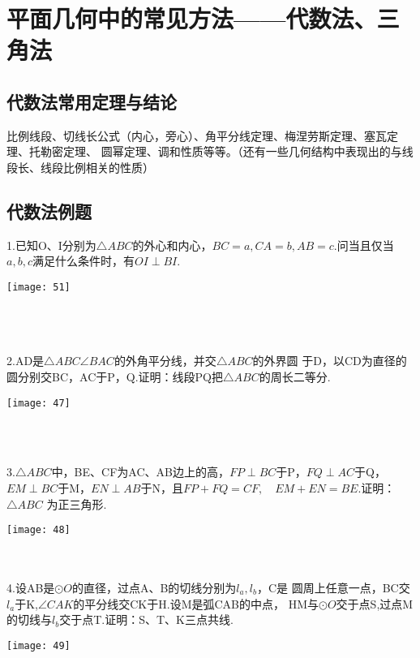 \section{平面几何中的常见方法——代数法、三角法}

\subsection{代数法常用定理与结论}

比例线段、切线长公式（内心，旁心）、角平分线定理、梅涅劳斯定理、塞瓦定理、托勒密定理、
圆幂定理、调和性质等等。（还有一些几何结构中表现出的与线段长、线段比例相关的性质）

\subsection{代数法例题}
1.已知O、I分别为$\bigtriangleup ABC$的外心和内心，$BC=a,CA=b,AB=c$.问当且仅当$a,b,c$满足什么条件时，有$OI\perp BI$.
\begin{flushleft}
    \texttt{[image: 51]}
\end{flushleft}
~\\
~\\
~\\


2.AD是$\bigtriangleup ABC\angle BAC$的外角平分线，并交$\bigtriangleup ABC$的外界圆
于D，以CD为直径的圆分别交BC，AC于P，Q.证明：线段PQ把$\bigtriangleup ABC$的周长二等分.
\begin{flushleft}
    \texttt{[image: 47]}
\end{flushleft}
~\\
~\\
\newpage

3.$\bigtriangleup ABC$中，BE、CF为AC、AB边上的高，$FP\perp BC$于P，$FQ\perp AC$于Q，
$EM\perp BC$于M，$EN\perp AB$于N，且$FP+FQ=CF,\quad EM+EN=BE$.证明：$\bigtriangleup ABC$
为正三角形.
\begin{flushleft}
    \texttt{[image: 48]}
\end{flushleft}
~\\
~\\



4.设AB是$\odot O$的直径，过点A、B的切线分别为$l_a,l_b$，C是
圆周上任意一点，BC交$l_a$于K,$\angle CAK$的平分线交CK于H.设M是弧CAB的中点，
HM与$\odot O$交于点S,过点M的切线与$l_b$交于点T.证明：S、T、K三点共线.
\begin{flushleft}
    \texttt{[image: 49]}
\end{flushleft}
~\\
~\\
~\\

